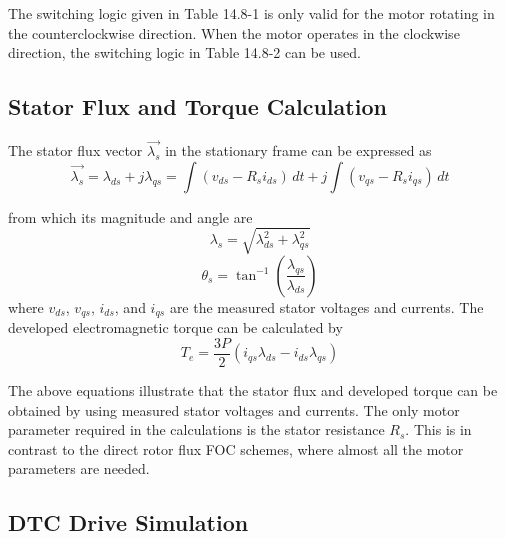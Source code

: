 \documentclass[letterpaper,12pt]{article}
\begin{document}
The switching logic given in Table 14.8-1 is only valid for the motor rotating in the counterclockwise direction. When the motor operates in the clockwise direction, the switching logic in Table 14.8-2 can be used.

\subsection{Stator Flux and Torque Calculation}

The stator flux vector $\vec{\lambda_s}$ in the stationary frame can be expressed as
\begin{equation}
    \vec{\lambda_s} = \lambda_{ds} + j\lambda_{qs} = \int (v_{ds} - R_s i_{ds}) \, dt + j \int (v_{qs} - R_s i_{qs}) \, dt \tag{14.8-3}
\end{equation}

from which its magnitude and angle are
\begin{equation}
    \lambda_s = \sqrt{\lambda_{ds}^2 + \lambda_{qs}^2} \tag{14.8-4}
\end{equation}
\begin{equation}
    \theta_s = \tan^{-1} \left( \frac{\lambda_{qs}}{\lambda_{ds}} \right) \tag{14.8-5}
\end{equation}
where $v_{ds}$, $v_{qs}$, $i_{ds}$, and $i_{qs}$ are the measured stator voltages and currents. The developed electromagnetic torque can be calculated by
\begin{equation}
    T_e = \frac{3P}{2} \left( i_{qs} \lambda_{ds} - i_{ds} \lambda_{qs} \right) \tag{14.8-6}
\end{equation}

The above equations illustrate that the stator flux and developed torque can be obtained by using measured stator voltages and currents. The only motor parameter required in the calculations is the stator resistance $R_s$. This is in contrast to the direct rotor flux FOC schemes, where almost all the motor parameters are needed.

\subsection{DTC Drive Simulation}
\end{document}
